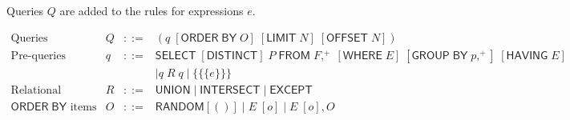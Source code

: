 \documentclass{article}
\newcommand{\mt}[1]{\mathsf{#1}}
\begin{document}
Queries $Q$ are added to the rules for expressions $e$.

$$\begin{array}{rrcll}
  \textrm{Queries} & Q &::=& (q \; [\mt{ORDER} \; \mt{BY} \; O] \; [\mt{LIMIT} \; N] \; [\mt{OFFSET} \; N]) \\
  \textrm{Pre-queries} & q &::=& \mt{SELECT} \; [\mt{DISTINCT}] \; P \; \mt{FROM} \; F,^+ \; [\mt{WHERE} \; E] \; [\mt{GROUP} \; \mt{BY} \; p,^+] \; [\mt{HAVING} \; E] \\
  &&& \mid q \; R \; q \mid \{\{\{e\}\}\} \\
  \textrm{Relational operators} & R &::=& \mt{UNION} \mid \mt{INTERSECT} \mid \mt{EXCEPT} \\
  \textrm{$\mt{ORDER \; BY}$ items} & O &::=& \mt{RANDOM} [()] \mid E \; [o] \mid E \; [o], O
\end{array}$$
\end{document}
